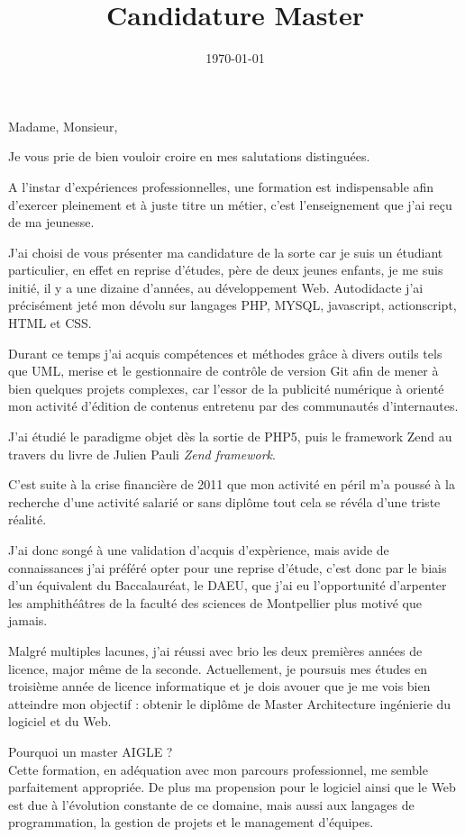 \documentclass[11pt,a4paper,sans]{moderncv}        %
\title{Candidature Master}
\begin{document}
\date{\today}
\opening{Madame, Monsieur, }
\closing{Je vous prie de bien vouloir croire en mes salutations distinguées.}
\makelettertitle

A l’instar d’expériences professionnelles, une formation est indispensable afin d’exercer pleinement et à juste titre un métier, c’est l’enseignement que j’ai reçu de ma jeunesse.

J’ai choisi de vous présenter ma candidature de la sorte car je suis un étudiant particulier, en effet en reprise d’études, père de deux jeunes enfants, je me suis initié, il y a une dizaine d’années, au développement Web. Autodidacte j’ai précisément jeté mon dévolu sur langages PHP, MYSQL, javascript, actionscript, HTML et CSS. 

Durant ce temps j’ai acquis compétences et méthodes grâce à divers outils tels que UML, merise et le gestionnaire de contrôle de version Git afin de mener à bien quelques projets complexes, car l’essor de la publicité numérique à orienté mon activité d’édition de contenus entretenu par des communautés d’internautes.

J’ai étudié le paradigme objet dès la sortie de PHP5, puis le framework Zend au travers du livre de Julien Pauli \textit{Zend framework}.

C’est suite à la crise financière de 2011 que mon activité en péril m’a poussé à la recherche d’une activité salarié or sans diplôme tout cela se révéla d’une triste réalité.

J’ai donc songé à une validation d’acquis d’expèrience, mais avide de connaissances j’ai préféré opter pour une reprise d’étude, c’est donc par le biais d’un équivalent du Baccalauréat, le DAEU, que j’ai eu l’opportunité d’arpenter les amphithéâtres de la faculté des sciences de Montpellier plus motivé que jamais. 

Malgré multiples lacunes, j’ai réussi avec brio les deux premières années de licence, major même de la seconde. Actuellement, je poursuis mes études en troisième année de licence informatique et je dois avouer que je me vois bien atteindre mon objectif : obtenir le diplôme de Master Architecture ingénierie du logiciel et du Web.

Pourquoi un master AIGLE ?\\
Cette formation, en adéquation avec mon parcours professionnel, me semble parfaitement appropriée. De plus ma propension pour le logiciel ainsi que le Web est due à l'évolution constante de ce domaine, mais aussi aux langages de programmation, la gestion de projets et le management d'équipes.

\makeletterclosing
\end{document}
